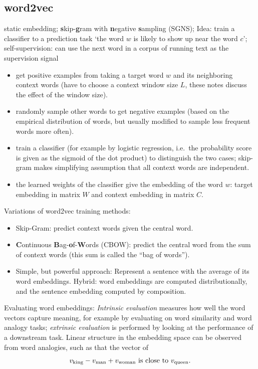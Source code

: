\documentclass[11pt, a4paper]{amsart}
\begin{document}
\subsection{word2vec}

static embedding;
\textbf{s}kip-\textbf{g}ram with \textbf{n}egative \textbf{s}ampling (SGNS);
Idea: train a classifier to a prediction task `the word $w$ is likely to show up near the word $c$';
self-supervision: can use the next word in a corpus of running text as the supervision signal
\begin{itemize}
    \item get positive examples from taking a target word $w$ and its neighboring context words (have to choose a context window size $L$, these notes \cite{DBLP:journals/corr/Goldberg15c} discuss the effect of the window size).
    \item randomly sample other words to get negative examples (based on the empirical distribution of words, but usually modified to sample less frequent words more often).
    \item train a classifier (for example by logistic regression, i.e.\ the probability score is given as the sigmoid of the dot product) to distinguish the two cases;
    skip-gram makes simplifying assumption that all context words are independent.
    \item the learned weights of the classifier give the embedding of the word $w$:
    target embedding in matrix $W$ and context embedding in matrix $C$.
\end{itemize}
Variations of word2vec training methods:
\begin{itemize}
    \item Skip-Gram:
    predict context words given the central word.
    \item \textbf{C}ontinuous \textbf{B}ag-\textbf{o}f-\textbf{W}ords (CBOW):
    predict the central word from the sum of context words (this sum is called the ``bag of words'').
    \item Simple, but powerful approach:
    Represent a sentence with the average of its word embeddings.
    Hybrid: word embeddings are computed distributionally, and the sentence embedding computed by composition.
\end{itemize}

Evaluating word embeddings:
\emph{Intrinsic evaluation} measures how well the word vectors capture meaning, for example by evaluating on word similarity and word analogy tasks;
\emph{extrinsic evaluation} is performed by looking at the performance of a downstream task.
Linear structure in the embedding space can be observed from word analogies, such as that the vector of
\[
    v_{\textup{king}} - v_{\textup{man}} + v_{\textup{woman}} \text{ is close to } v_{\textup{queen}}.
\]
\end{document}
